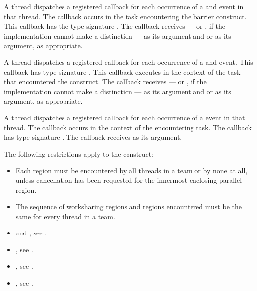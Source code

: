 \tools

A thread dispatches a registered 
callback for each occurrence of a  and  event
in that thread.  The callback occurs in the task encountering
the barrier construct.  This callback has the type signature
.
The callback receives
 --- or
, if the implementation cannot make a
distinction --- as its  argument and
 or 
as its  argument, as appropriate.

A thread dispatches a registered
 callback
for each occurrence of a  and  event.
This callback has type signature .
This callback executes in the context of the task that encountered the
 construct. The callback receives
 --- or
, if the implementation cannot make a
distinction --- as its  argument and
 or 
as its  argument, as appropriate.

A thread dispatches a registered 
callback for each occurrence of a  event in that thread.
The callback occurs in the context of the encountering task.  The callback has type signature
.
The callback receives  as its  argument.

\restrictions
The following restrictions apply to the  construct:

\begin{itemize}
\item Each  region must be encountered by all threads in a team or by none at all,
unless cancellation has been requested for the innermost enclosing parallel region.

\item The sequence of worksharing regions and  regions encountered must be the
same for every thread in a team.
\end{itemize}

\crossreferences
\begin{itemize}
\item {} and , see
.

\item {}, see
.

\item {}, see
.

\item {}, see
.

\end{itemize}






